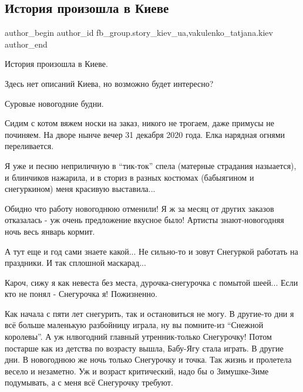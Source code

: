  
 
 
 
 
 
\subsection{История произошла в Киеве}
\label{sec:10_12_2021.fb.fb_group.story_kiev_ua.1.istoria_kiev}
 
\ifcmt
 author_begin
   author_id fb_group.story_kiev_ua,vakulenko_tatjana.kiev
 author_end
\fi

История произошла в Киеве.

Здесь нет описаний Киева, но возможно будет интересно?

Суровые новогодние будни.

Сидим с котом вяжем носки на заказ, никого не трогаем, даже примусы не
починяем. На дворе нынче вечер 31 декабря 2020 года. Елка нарядная огнями
переливается.


Я уже и песню неприличную в \enquote{тик-ток} спела (матерные страдания назыается), и
блинчиков нажарила, и в сториз в разных костюмах (бабыягином и снегуркином) меня
красивую выставила...

Обидно что работу новогоднюю отменили! Я ж за месяц от других заказов
отказалась - уж очень предложение вкусное было! Артисты знают-новогодняя ночь весь
январь кормит.

А тут еще и год сами знаете какой... Не сильно-то и зовут Снегуркой работать на
праздники. И так сплошной маскарад...

Кароч, сижу я как невеста без места, дурочка-снегурочка с помытой шеей... Если кто
не понял - Снегурочка я! Пожизненно.

Как начала с пяти лет снегурить, так и остановиться не могу. В другие-то дни я
всё больше маленькую разбойницу играла, ну вы помните-из \enquote{Снежной королевы}. А уж
нлвогодний главный утренник-только Снегурочку! Потом постарше как из детства по
возрасту вышла, Бабу-Ягу стала играть. В другие дни. В новогоднюю же ночь только
Снегурочку и точка. Так жизнь и пролетела весело и незаметно. Уж и возраст
критический, надо бы о Зимушке-Зиме подумывать, а с меня всё Снегурочку требуют.

